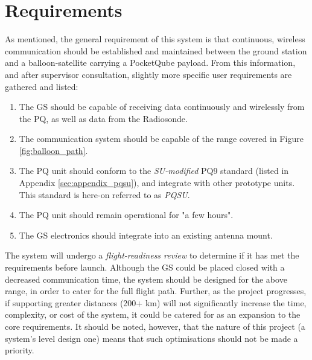 \section{Requirements}

As mentioned, the general requirement of this system is that continuous, wireless communication should be established and maintained between the ground station and a balloon-satellite carrying a PocketQube payload. From this information, and after supervisor consultation, slightly more specific user requirements are gathered and listed:
\begin{enumerate}
    \item The GS should be capable of receiving data continuously and wirelessly from the PQ, as well as data from the Radiosonde.
    \item The communication system should be capable of the range covered in Figure \ref{fig:balloon_path}.
    \item The PQ unit should conform to the \textit{SU-modified} PQ9 standard (listed in Appendix \ref{sec:appendix_pqsu}), and integrate with other prototype units. This standard is here-on referred to as \textit{PQSU}.
    \item The PQ unit should remain operational for "a few hours".
    \item The GS electronics should integrate into an existing antenna mount.
\end{enumerate}

The system will undergo a \textit{flight-readiness review} to determine if it has met the requirements before launch. Although the GS could be placed closed with a decreased communication time, the system should be designed for the above range, in order to cater for the full flight path. Further, as the project progresses, if supporting greater distances (200+ km) will not significantly increase the time, complexity, or cost of the system, it could be catered for as an expansion to the core requirements. It should be noted, however, that the nature of this project (a system's level design one) means that such optimisations should not be made a priority.